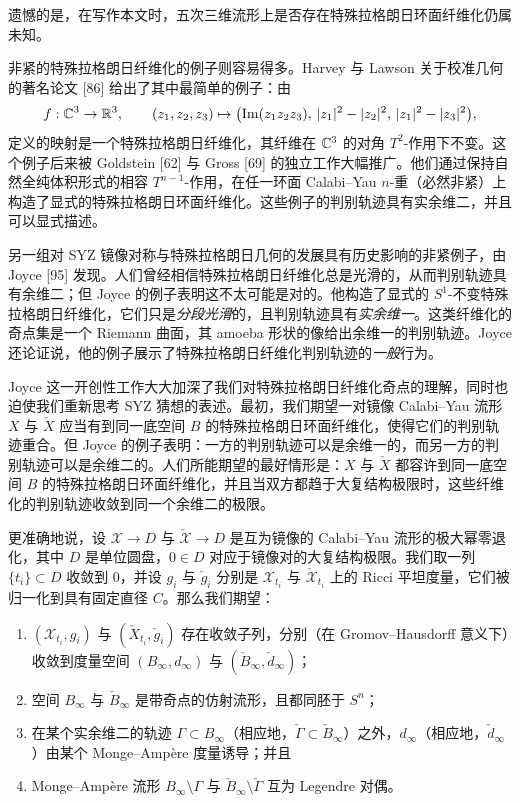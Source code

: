 遗憾的是，在写作本文时，五次三维流形上是否存在特殊拉格朗日环面纤维化仍属未知。

非紧的特殊拉格朗日纤维化的例子则容易得多。Harvey 与 Lawson 关于校准几何的著名论文 [86] 给出了其中最简单的例子：由
\[
  f : \mathbb{C}^3 \to \mathbb{R}^3,\qquad
  (z_1,z_2,z_3) \mapsto \bigl(\operatorname{Im}(z_1 z_2 z_3),\, |z_1|^2-|z_2|^2,\, |z_1|^2-|z_3|^2\bigr),
\]
定义的映射是一个特殊拉格朗日纤维化，其纤维在 $\mathbb{C}^3$ 的对角 $T^2$-作用下不变。这个例子后来被 Goldstein [62] 与 Gross [69] 的独立工作大幅推广。他们通过保持自然全纯体积形式的相容 $T^{n-1}$-作用，在任一环面 Calabi--Yau $n$-重（必然非紧）上构造了显式的特殊拉格朗日环面纤维化。这些例子的判别轨迹具有实余维二，并且可以显式描述。

另一组对 SYZ 镜像对称与特殊拉格朗日几何的发展具有历史影响的非紧例子，由 Joyce [95] 发现。人们曾经相信特殊拉格朗日纤维化总是光滑的，从而判别轨迹具有余维二；但 Joyce 的例子表明这不太可能是对的。他构造了显式的 $S^1$-不变特殊拉格朗日纤维化，它们只是\emph{分段光滑}的，且判别轨迹具有\emph{实余维一}。这类纤维化的奇点集是一个 Riemann 曲面，其 amoeba 形状的像给出余维一的判别轨迹。Joyce 还论证说，他的例子展示了特殊拉格朗日纤维化判别轨迹的\emph{一般}行为。

Joyce 这一开创性工作大大加深了我们对特殊拉格朗日纤维化奇点的理解，同时也迫使我们重新思考 SYZ 猜想的表述。最初，我们期望一对镜像 Calabi--Yau 流形 $X$ 与 $\check X$ 应当有到同一底空间 $B$ 的特殊拉格朗日环面纤维化，使得它们的判别轨迹重合。但 Joyce 的例子表明：一方的判别轨迹可以是余维一的，而另一方的判别轨迹可以是余维二的。人们所能期望的最好情形是：$X$ 与 $\check X$ 都容许到同一底空间 $B$ 的特殊拉格朗日环面纤维化，并且当双方都趋于大复结构极限时，这些纤维化的判别轨迹收敛到同一个余维二的极限。

更准确地说，设 $\mathcal{X} \to D$ 与 $\check{\mathcal{X}} \to D$ 是互为镜像的 Calabi--Yau 流形的极大幂零退化，其中 $D$ 是单位圆盘，$0 \in D$ 对应于镜像对的大复结构极限。我们取一列 $\{t_i\} \subset D$ 收敛到 $0$，并设 $g_i$ 与 $\check g_i$ 分别是 $\mathcal{X}_{t_i}$ 与 $\check{\mathcal{X}}_{t_i}$ 上的 Ricci 平坦度量，它们被归一化到具有固定直径 $C$。那么我们期望：
\begin{enumerate}
  \item $(\mathcal{X}_{t_i},g_i)$ 与 $(\check X_{t_i},\check g_i)$ 存在收敛子列，分别（在 Gromov--Hausdorff 意义下）收敛到度量空间 $(B_\infty,d_\infty)$ 与 $(\check B_\infty,\check d_\infty)$；
  \item 空间 $B_\infty$ 与 $\check B_\infty$ 是带奇点的仿射流形，且都同胚于 $S^n$；
  \item 在某个实余维二的轨迹 $\Gamma \subset B_\infty$（相应地，$\check\Gamma \subset \check B_\infty$）之外，$d_\infty$（相应地，$\check d_\infty$）由某个 Monge--Amp\`ere 度量诱导；并且
  \item Monge--Amp\`ere 流形 $B_\infty \setminus \Gamma$ 与 $\check B_\infty \setminus \check\Gamma$ 互为 Legendre 对偶。
\end{enumerate}

